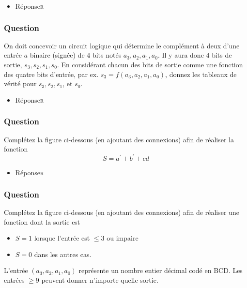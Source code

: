 \documentclass[11pt]{article}
\begin{document}
\begin{itemize}
\item Réponse\hfill{}\textsc{r}
\label{sec:orgf99b3a4}
\end{itemize}

\subsubsection*{Question}
\label{sec:orge138bf3}
On doit concevoir un circuit logique qui détermine le complément à deux
  d'une entrée \(a\) binaire (signée) de 4 bits notés
  \(a_3, a_2, a_1, a_0\). Il y aura donc 4 bits de sortie, \(s_3,
      s_2, s_1, s_0\). En considérant chacun des bits de sortie comme une
  fonction des quatre bits d'entrée, par ex. \(s_3 = f(a_3, a_2, a_1,
      a_0)\), donnez les tableaux de vérité pour \(s_3, s_2, s_1\), et \(s_0\).

\begin{itemize}
\item Réponse\hfill{}\textsc{r}
\label{sec:org6ade360}
\end{itemize}

\subsubsection*{Question}
\label{sec:org6e79e43}
Complétez la figure ci-dessous (en ajoutant des connexions) afin de
  réaliser la fonction 
  $$
    S= a^\prime + b^\prime + c d
    $$
  \begin{center}

\end{center}

\begin{itemize}
\item Réponse\hfill{}\textsc{r}
\label{sec:org108a463}
\end{itemize}

\subsubsection*{Question}
\label{sec:org14af887}
Complétez la figure ci-dessous (en ajoutant des connexions) afin de
  réaliser une fonction dont la sortie est 
\begin{itemize}
\item \(S=1\) lorsque l'entrée est \(\leq 3\) ou impaire
\item \(S=0\) dans les autres cas.
\end{itemize}
    L'entrée \((a_3,a_2,a_1, a_0)\) représente un nombre entier
   décimal codé en BCD. Les entrées \(\geq 9\) peuvent donner
   n'importe quelle sortie.
\begin{center}

\end{center}
\end{document}
